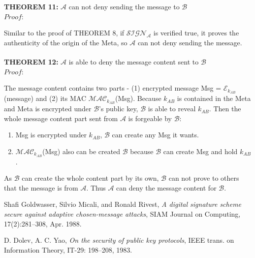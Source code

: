 \documentclass[10pt,a4paper]{article}
\begin{document}
\\
\\
\textbf{THEOREM 11:} $\mathcal{A}$ can not deny sending the message to $\mathcal{B}$\\
\emph{$Proof:$} \par
Similar to the proof of THEOREM 8, if $\mathcal{SIGN_A}$ is verified true, it proves the authenticity of the origin of the Meta, so $\mathcal{A}$ can not deny sending the message.
\\
\\
\textbf{THEOREM 12:} $\mathcal{A}$ is able to deny the message content sent to $\mathcal{B}$ \\
\emph{$Proof:$} \par
The message content contains two parts - (1) encrypted message Msg =  $\mathcal{E}_{k_{AB}}$(message) and (2) its MAC $\mathcal{MAC}_{k_{AB}}$(Msg). Because $k_{AB}$ is contained in the Meta and Meta is encrypted under $\mathcal{B}$'s public key, $\mathcal{B}$ is able to reveal $k_{AB}$. Then the whole message content part sent from $\mathcal{A}$ is forgeable by $\mathcal{B}$:
\begin{enumerate}
\item Msg is encrypted under $k_{AB}$, $\mathcal{B}$ can create any Msg it wants.
\item $\mathcal{MAC}_{k_{AB}}$(Msg) also can be created $\mathcal{B}$ because $\mathcal{B}$ can create Msg and hold $k_{AB}$.
\end{enumerate}
As $\mathcal{B}$ can create the whole content part by its own, $\mathcal{B}$ can not prove to others that the message is from $\mathcal{A}$. Thus $\mathcal{A}$ can deny the message content for $\mathcal{B}$.

\begin{thebibliography}{9}
  Shafi Goldwasser, Silvio Micali, and Ronald Rivest,
  \emph{A digital signature scheme secure against adaptive chosen-message attacks},  SIAM Journal on Computing,
  17(2):281–308,
  Apr. 1988.
  
  D. Dolev, A. C. Yao,
  \emph{On the security of public key protocols},
  IEEE trans. on Information Theory,
  IT-29: 198–208,
  1983.
\end{thebibliography}
\end{document}
